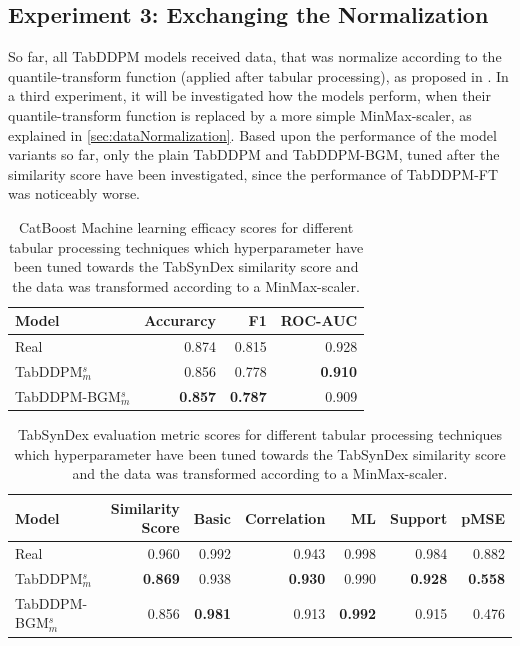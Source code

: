 \subsection[]{Experiment 3: Exchanging the Normalization}
\label{ch:Experiment-3}

So far, all TabDDPM models received data, that was normalize according to the quantile-transform function (applied after tabular processing), as proposed in \cite{kotelnikov2022TabDDPMModellingTabular}.
In a third experiment, it will be investigated how the models perform, when their quantile-transform function is replaced by a more simple MinMax-scaler, as explained in \autoref{sec:dataNormalization}.
Based upon the performance of the model variants so far, only the plain TabDDPM and TabDDPM-BGM, tuned after the similarity score have been investigated, since the performance of TabDDPM-FT was noticeably worse.


\begin{table}[h]
	\centering
	\begin{tabular}{lrrr}
		\toprule
		\textbf{Model}        & \textbf{Accurarcy} & \textbf{F1}    & \textbf{ROC-AUC} \\
		\midrule
		Real                  & 0.874              & 0.815          & 0.928            \\
		TabDDPM$^{s}_{m}$     & 0.856              & 0.778          & \textbf{0.910}   \\
		TabDDPM-BGM$^{s}_{m}$ & \textbf{0.857}     & \textbf{0.787} & 0.909            \\
		\bottomrule
	\end{tabular}
	\caption[Experiment3-ML-Efficacy]{CatBoost Machine learning efficacy scores for different tabular processing techniques which hyperparameter have been tuned towards the TabSynDex similarity score
		and the data was transformed according to a MinMax-scaler.}
	\label{tab:exp3-ml}
\end{table}

\begin{table}[h]
	\centering
	\begin{tabular}{lrrrrrr}
		\toprule
		\textbf{Model}        & \textbf{Similarity Score} & \textbf{Basic} & \textbf{Correlation} & \textbf{ML}    & \textbf{Support} & \textbf{pMSE}  \\
		\midrule
		Real                  & 0.960                     & 0.992          & 0.943                & 0.998          & 0.984            & 0.882          \\
		TabDDPM$^{s}_{m}$     & \textbf{0.869}            & 0.938          & \textbf{0.930}       & 0.990          & \textbf{0.928}   & \textbf{0.558} \\
		TabDDPM-BGM$^{s}_{m}$ & 0.856                     & \textbf{0.981} & 0.913                & \textbf{0.992} & 0.915            & 0.476          \\
		\bottomrule
	\end{tabular}
	\caption[Experiment3-Similarity]{TabSynDex evaluation metric scores for different tabular processing techniques which hyperparameter have been tuned towards the TabSynDex similarity score
		and the data was transformed according to a MinMax-scaler.}
	\label{tab:exp3-sim}
\end{table}

